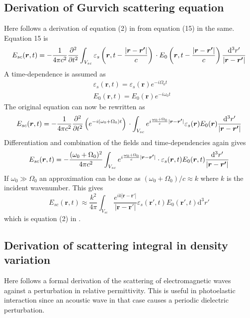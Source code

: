 \documentclass[10pt,a4paper,draft]{scrartcl}
\begin{document}
	\subsection{Derivation of Gurvich scattering equation}
	Here follows a derivation of equation (2) in \cite{Gurvich1987} from equation (15) in the same. Equation 15 is
	\begin{equation*}
		E_{sc} (\bm{r},t) = -\frac{1}{4\pi c^2} \frac{\partial^2}{\partial t^2} \int_{V_{sc}}
		\varepsilon_s\left( \bm{r}, t - \frac{\left|\bm{r}-\bm{r'}\right|}{c} \right)\\
		\cdot E_0 \left( \bm{r}, t - \frac{\left|\bm{r}-\bm{r'}\right|}{c} \right)
		\frac{\mathrm{d}^3r'}{\left|\bm{r}-\bm{r'}\right|}
	\end{equation*}
	A time-dependence is assumed as
	\begin{align*}
		&\varepsilon_s(\bm{r}, t) = \varepsilon_s(\bm{r}) e^{-i\Omega_0 t} \\
		&E_0(\bm{r},t) = E_0(\bm{r}) e^{-i\omega_0 t}
	\end{align*}
	The original equation can now be rewritten as
	\begin{equation*}
	E_{sc} (\bm{r},t) = -\frac{1}{4\pi c^2}
	\frac{\partial^2}{\partial t^2} \left( e^{-i(\omega_0 + \Omega_0)t} \right) \\
	\cdot \int_{V_{sc}} e^{i\frac{\omega_0 + \Omega_0}{c} |\bm{r}-\bm{r'}|}
	\varepsilon_s(\bm{r}) E_0 (\bm{r})
	\frac{\mathrm{d}^3r'}{\left|\bm{r}-\bm{r'}\right|}
	\end{equation*}
	Differentiation and combination of the fields and time-dependencies again gives
	\begin{equation*}
	E_{sc} (\bm{r},t) = -\frac{(\omega_0 + \Omega_0)^2}{4\pi c^2}
	\int_{V_{sc}} e^{i\frac{\omega_0 + \Omega_0}{c} |\bm{r}-\bm{r'}|}\\
	\cdot \varepsilon_s(\bm{r},t) E_0 (\bm{r},t)
	\frac{\mathrm{d}^3r'}{\left|\bm{r}-\bm{r'}\right|}
	\end{equation*}
	If $\omega_0 \gg \Omega_0$ an approximation can be done as $(\omega_0 + \Omega_0)/c \approx k$ where $k$ is the incident wavenumber. This gives
	\begin{equation*}
	E_{sc}(\bm{r},t) \approx \frac{k^2}{4\pi} \int_{V_{sc}} \frac{e^{ik \left| \bm{r}-\bm{r'} \right| }}{ \left| \bm{r}-\bm{r'} \right| } \varepsilon_s (\bm{r'},t) E_0 (\bm{r'},t) \mathrm{d}^3r'
	\end{equation*}
	which is equation (2) in \cite{Gurvich1987}.
	
	\subsection{Derivation of scattering integral in density variation}
	Here follows a formal derivation of the scattering of electromagnetic waves against a perturbation in relative permittivity. This is useful in photoelastic interaction since an acoustic wave in that case causes a periodic dielectric perturbation.
	
\end{document}

